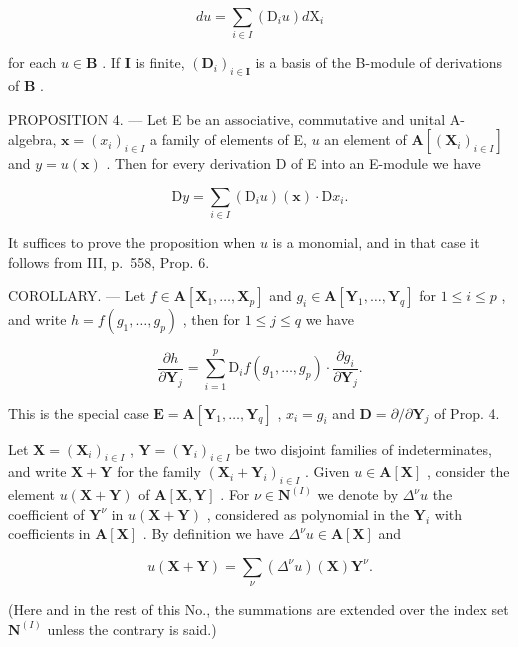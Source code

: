 \[
d u = \sum_ {i \in I} \left(\mathrm{D} _ {i} u\right) d \mathrm{X} _ {i}\tag{7}
\]

for each \(u \in \mathbf{B}\) . If \(\mathbf{I}\) is finite, \((\mathbf{D}_i)_{i \in \mathbf{I}}\) is a basis of the B-module of derivations of \(\mathbf{B}\) .

PROPOSITION 4. --- Let E be an associative, commutative and unital A-algebra, \(\mathbf{x} = (x_i)_{i\in I}\) a family of elements of E, \(u\) an element of \(\mathbf{A}[(\mathbf{X}_i)_{i\in I}]\) and \(y = u(\mathbf{x})\) . Then for every derivation D of E into an E-module we have

\[
\mathrm{D} y = \sum_ {i \in I} \left(\mathrm{D} _ {i} u\right) (\mathbf {x}) \cdot \mathrm{D} x _ {i}.
\]

It suffices to prove the proposition when \(u\) is a monomial, and in that case it follows from III, p.~558, Prop. 6.

COROLLARY. --- Let \(f \in \mathbf{A}[\mathbf{X}_1, \ldots, \mathbf{X}_p]\) and \(g_i \in \mathbf{A}[\mathbf{Y}_1, \ldots, \mathbf{Y}_q]\) for \(1 \leqslant i \leqslant p\) , and write \(h = f(g_1, \ldots, g_p)\) , then for \(1 \leqslant j \leqslant q\) we have

\[
\frac {\partial h}{\partial \mathbf {Y} _ {j}} = \sum_ {i = 1} ^ {p} \mathrm{D} _ {i} f (g _ {1}, \dots , g _ {p}) \cdot \frac {\partial g _ {i}}{\partial \mathbf {Y} _ {j}}.\tag{8}
\]

This is the special case \(\mathbf{E} = \mathbf{A}[\mathbf{Y}_1,\dots ,\mathbf{Y}_q]\) , \(x_{i} = g_{i}\) and \(\mathbf{D} = \partial /\partial \mathbf{Y}_j\) of Prop. 4.

Let \(\mathbf{X} = (\mathbf{X}_i)_{i\in I}\) , \(\mathbf{Y} = (\mathbf{Y}_i)_{i\in I}\) be two disjoint families of indeterminates, and write \(\mathbf{X} + \mathbf{Y}\) for the family \((\mathbf{X}_i + \mathbf{Y}_i)_{i\in I}\) . Given \(u\in \mathbf{A}[\mathbf{X}]\) , consider the element \(u(\mathbf{X} + \mathbf{Y})\) of \(\mathbf{A}[\mathbf{X},\mathbf{Y}]\) . For \(\nu \in \mathbf{N}^{(I)}\) we denote by \(\Delta^{\nu}u\) the coefficient of \(\mathbf{Y}^{\nu}\) in \(u(\mathbf{X} + \mathbf{Y})\) , considered as polynomial in the \(\mathbf{Y}_i\) with coefficients in \(\mathbf{A}[\mathbf{X}]\) . By definition we have \(\Delta^{\nu}u\in \mathbf{A}[\mathbf{X}]\) and

\[
u (\mathbf {X} + \mathbf {Y}) = \sum_ {\nu} \left(\Delta^ {\nu} u\right) (\mathbf {X}) \mathbf {Y} ^ {\nu}.\tag{9}
\]

(Here and in the rest of this No., the summations are extended over the index set \(\mathbf{N}^{(I)}\) unless the contrary is said.)

